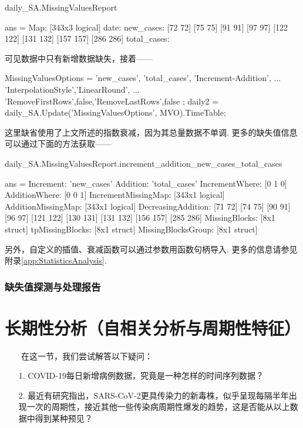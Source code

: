 \documentclass[a4paper, titlepage]{article}
\begin{document}
\begin{spacing}{0.7}
\begin{matlabcode}
daily_SA.MissingValuesReport
\end{matlabcode}
\begin{matlaboutput}
ans = 
        Map: [343x3 logical]
       date: {}
  new_cases: {[72 72] [75 75] [91 91] [97 97] [122 122] [131 132] [157 157] [286 286]}
total_cases: {}
\end{matlaboutput}
\end{spacing}
可见数据中只有新增数据缺失，接着——
\begin{matlabcode}
MissingValuesOptions = { {'new_cases', 'total_cases'}, 'Increment-Addition', ...
        {'InterpolationStyle','LinearRound', ...
        'RemoveFirstRows',false,'RemoveLastRows',false}
    };
daily2 = daily_SA.Update('MissingValuesOptions', MVO).TimeTable;
\end{matlabcode}
这里缺省使用了上文所述的指数衰减，因为其总量数据不单调. 更多的缺失值信息可以通过下面的方法获取——
\begin{spacing}{0.7}
\begin{matlabcode}
daily_SA.MissingValuesReport.increment_addition_new_cases_total_cases
\end{matlabcode}
\begin{matlaboutput}
ans = 
          Increment: 'new_cases'
           Addition: 'total_cases'
     IncrementWhere: [0 1 0]
      AdditionWhere: [0 0 1]
IncrementMissingMap: [343x1 logical]
 AdditionMissingMap: [343x1 logical]
 DecreasingAddition: {[71 72] [74 75] [90 91] [96 97] [121 122] [130 131] 
                      [131 132] [156 157] [285 286]}
      MissingBlocks: [8x1 struct]
    tpMissingBlocks: [8x1 struct]
 MissingBlocksGroup: [8x1 struct]
\end{matlaboutput}
\end{spacing}
另外，自定义的插值、衰减函数可以通过参数用函数句柄导入. 更多的信息请参见附录\ref{app:StatisticsAnalysis}. 
    \subsubsection{缺失值探测与处理报告}
    
    \newpage
    \section{长期性分析（自相关分析与周期性特征）}\label{自相关分析}
        　　在这一节，我们尝试解答以下疑问：
        \begin{enumerate}
            \item [1.] COVID-19每日新增病例数据，究竟是一种怎样的时间序列数据？
            \item [2.] 最近有研究指出，SARS-CoV-2更具传染力的新毒株，似乎呈现每隔半年出现一次的周期性，接近其他一些传染病周期性爆发的趋势，这是否能从以上数据中得到某种预见？
        \end{enumerate}
        
\end{document}
